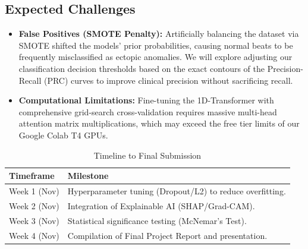 \documentclass[11pt, conference]{IEEEtran}
\begin{document}
\subsection{Expected Challenges}
\begin{itemize}
    \item \textbf{False Positives (SMOTE Penalty):} Artificially balancing the dataset via SMOTE shifted the models' prior probabilities, causing normal beats to be frequently misclassified as ectopic anomalies. We will explore adjusting our classification decision thresholds based on the exact contours of the Precision-Recall (PRC) curves to improve clinical precision without sacrificing recall.
    \item \textbf{Computational Limitations:} Fine-tuning the 1D-Transformer with comprehensive grid-search cross-validation requires massive multi-head attention matrix multiplications, which may exceed the free tier limits of our Google Colab T4 GPUs.
\end{itemize}

\begin{table}[H]
\centering
\caption{Timeline to Final Submission}
\begin{tabular}{|p{2.5cm}|p{5cm}|}
\hline
\textbf{Timeframe} & \textbf{Milestone} \\ \hline
Week 1 (Nov) & Hyperparameter tuning (Dropout/L2) to reduce overfitting. \\ \hline
Week 2 (Nov) & Integration of Explainable AI (SHAP/Grad-CAM). \\ \hline
Week 3 (Nov) & Statistical significance testing (McNemar's Test). \\ \hline
Week 4 (Nov) & Compilation of Final Project Report and presentation. \\ \hline
\end{tabular}
\end{table}
\end{document}
